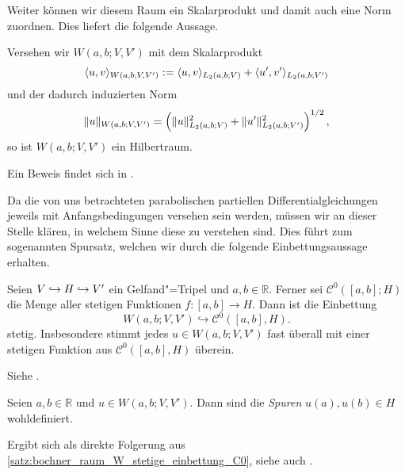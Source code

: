 \documentclass[../main.tex]{subfiles}
\begin{document}
Weiter können wir diesem Raum ein Skalarprodukt und damit auch eine Norm zuordnen.
Dies liefert die folgende Aussage.

\begin{Lemma}
\label{lemma:bochner_W_ist_hilbertraum}
    Versehen wir $W(a, b; V, V')$ mit dem Skalarprodukt
    \begin{equation}
        \langle u,v\rangle_{W(a, b; V, V')} := \langle u,v\rangle_{L_{2}(a, b; V)} + \langle u',v'\rangle_{L_{2}(a, b; V')}
    \end{equation}
    und der dadurch induzierten Norm
    \begin{equation}
        \lVert u\rVert_{W(a, b; V, V')} = \left( \lVert u\rVert_{L_{2}(a, b; V)}^{2} + \lVert u'\rVert_{L_{2}(a, b; V')}^{2} \right)^{1/2},
    \end{equation}
    so ist $W(a, b; V, V')$ ein Hilbertraum.

    \begin{Beweis}
        Ein Beweis findet sich in \cite[Proposition XVIII.2.6]{Dautray:1992by}.
    \end{Beweis}
\end{Lemma}

Da die von uns betrachteten parabolischen partiellen Differentialgleichungen jeweils mit Anfangsbedingungen versehen sein werden, müssen wir an dieser Stelle klären, in welchem Sinne diese zu verstehen sind.
Dies führt zum sogenannten Spursatz, welchen wir durch die folgende Einbettungsaussage erhalten.

\begin{Satz}
\label{satz:bochner_raum_W_stetige_einbettung_C0}
    Seien $V \hookrightarrow H \hookrightarrow V'$ ein Gelfand"=Tripel und $a, b \in \mathbb{R}$.
    Ferner sei $\mathcal C^{0}([a, b]; H)$ die Menge aller stetigen Funktionen $f \colon [a, b] \to H$.
    Dann ist die Einbettung
    \begin{equation}
        W(a, b; V, V') \hookrightarrow \mathcal C^{0}([a, b], H).
    \end{equation}
    stetig.
    Insbesondere stimmt jedes $u \in W(a, b; V, V')$ fast überall mit einer stetigen Funktion aus $\mathcal C^{0}([a, b], H)$ überein.

    \begin{Beweis}
        Siehe \cites[Theorem XVIII.2.1]{Dautray:1992by}[Theorem 10.9]{Schweizer2013}.
    \end{Beweis}
\end{Satz}

\begin{Korollar}[Spursatz]
\label{korollar:spursatz}
    Seien $a, b \in \mathbb{R}$ und $u \in W(a, b; V, V')$.
    Dann sind die \emph{Spuren} $u(a), u(b) \in H$ wohldefiniert.

    \begin{Beweis}
        Ergibt sich als direkte Folgerung aus \cref{satz:bochner_raum_W_stetige_einbettung_C0}, siehe auch \cite[Remark XVIII.2.4]{Dautray:1992by}.
    \end{Beweis}
\end{Korollar}
\end{document}
